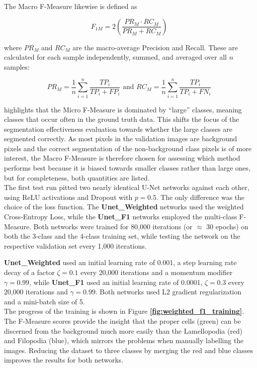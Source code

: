 \noindent The Macro F-Measure likewise is defined as

\[ F_{1M} = 2 \left ( \frac{PR_M \cdot RC_M}{PR_M + RC_M} \right ) \]

\noindent where $PR_M$ and $RC_M$ are the macro-average Precision and Recall. These are calculated for each sample independently, summed, and averaged over all $n$ samples:

\[ PR_M = \frac{1}{n} \sum_{i=1}^{n} \frac{TP_i}{TP_i + FP_i} \text { and } RC_M = \frac{1}{n} \sum_{i=1}^{n} \frac{TP_i}{TP_i + FN_i} \] 

\noindent \cite[pp. 317-318]{information_retrieval} highlights that the Micro F-Measure is dominated by ``large'' classes, meaning classes that occur often in the ground truth data. This shifts the focus of the segmentation effectiveness evaluation towards whether the large classes are segmented correctly. As most pixels in the validation images are background pixels and the correct segmentation of the non-background class pixels is of more interest, the Macro F-Measure is therefore chosen for assessing which method performs best because it is biased towards smaller classes rather than large ones, but for completeness, both quantities are listed.\\

\noindent The first test run pitted two nearly identical U-Net networks against each other, using ReLU activations and Dropout with $p = 0.5$. The only difference was the choice of the loss function. The \textbf{Unet\_Weighted} networks used the weighted Cross-Entropy Loss, while the \textbf{Unet\_F1} networks employed the multi-class F-Measure. Both networks were trained for 80,000 iterations (or $\approx$ 30 epochs) on both the 3-class and the 4-class training set, while testing the network on the respective validation set every 1,000 iterations.

\textbf{Unet\_Weighted} used an initial learning rate of 0.001, a step learning rate decay of a factor $\zeta = 0.1$ every 20,000 iterations and a momentum modifier $\gamma = 0.99$, while \textbf{Unet\_F1} used an initial learning rate of 0.0001, $\zeta = 0.3$ every 20,000 iterations and $\gamma = 0.99$. Both networks used L2 gradient regularization and a mini-batch size of 5.\\

\noindent The progress of the training is shown in Figure \textbf{\ref{fig:weighted_f1_training}}. The F-Measure scores provide the insight that the proper cells (green) can be discerned from the background much more easily than the Lamellopodia (red) and Filopodia (blue), which mirrors the problems when manually labelling the images. Reducing the dataset to three classes by merging the red and blue classes improves the results for both networks.\\

